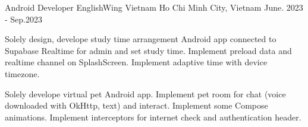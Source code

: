 \begin{cventries}
  \cventry
    {Android Developer}
    {EnglishWing Vietnam}
    {Ho Chi Minh City, Vietnam}
    {June. 2023 - Sep.2023}
    {
    \begin{cvitems}
        \item {
          Solely design, develope study time arrangement Android app connected to Supabase Realtime for admin and set study time.
          Implement preload data and realtime channel on SplashScreen.
          Implement adaptive time with device timezone.
          }
        \item {
          Solely develope virtual pet Android app.
          Implement pet room for chat (voice downloaded with OkHttp, text) and interact.
          Implement some Compose animations.
          Implement interceptors for internet check and authentication header.
          }
      \end{cvitems}
    }
\end{cventries}
